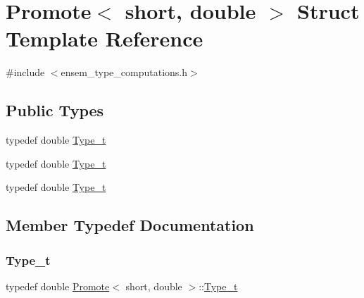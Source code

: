 \hypertarget{structPromote_3_01short_00_01double_01_4}{}\section{Promote$<$ short, double $>$ Struct Template Reference}
\label{structPromote_3_01short_00_01double_01_4}


{\ttfamily \#include $<$ensem\+\_\+type\+\_\+computations.\+h$>$}

\subsection*{Public Types}
\begin{DoxyCompactItemize}
\item 
typedef double \mbox{\hyperlink{structPromote_3_01short_00_01double_01_4_ac1a01602078262e2918f806dee9199c4}{Type\+\_\+t}}
\item 
typedef double \mbox{\hyperlink{structPromote_3_01short_00_01double_01_4_ac1a01602078262e2918f806dee9199c4}{Type\+\_\+t}}
\item 
typedef double \mbox{\hyperlink{structPromote_3_01short_00_01double_01_4_ac1a01602078262e2918f806dee9199c4}{Type\+\_\+t}}
\end{DoxyCompactItemize}


\subsection{Member Typedef Documentation}
\mbox{\label{structPromote_3_01short_00_01double_01_4_ac1a01602078262e2918f806dee9199c4}} 
\subsubsection{\texorpdfstring{Type\_t}{Type\_t}\hspace{0.1cm}{\footnotesize\ttfamily [1/3]}}
{\footnotesize\ttfamily typedef double \mbox{\hyperlink{structPromote}{Promote}}$<$ short, double $>$\+::\mbox{\hyperlink{structPromote_3_01short_00_01double_01_4_ac1a01602078262e2918f806dee9199c4}{Type\+\_\+t}}}

\mbox{\label{structPromote_3_01short_00_01double_01_4_ac1a01602078262e2918f806dee9199c4}} 
